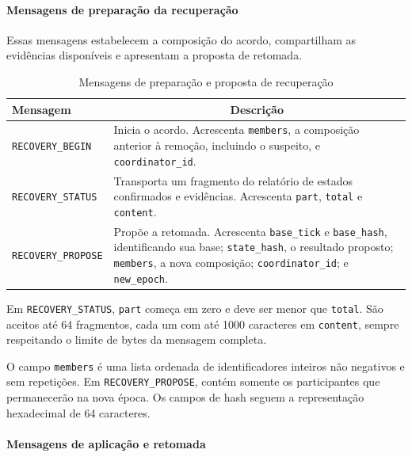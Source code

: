 \documentclass[11pt,a4paper]{article}
\begin{document}
\paragraph{Mensagens de preparação da recuperação}

Essas mensagens estabelecem a composição do acordo, compartilham as evidências disponíveis e apresentam a proposta de retomada.

\begin{table}[H]
    \centering
    \caption{Mensagens de preparação e proposta de recuperação}
    \label{tab:preparacao_recuperacao_p2p}
    \begin{tabular}{|p{4.3cm}|p{9.2cm}|}
        \hline
        \textbf{Mensagem} &
        \multicolumn{1}{c|}{\textbf{Descrição}} \\ \hline

        \texttt{RECOVERY\_BEGIN} &
        Inicia o acordo. Acrescenta \texttt{members}, a composição anterior à remoção, incluindo o suspeito, e \texttt{coordinator\_id}. \\ \hline

        \texttt{RECOVERY\_STATUS} &
        Transporta um fragmento do relatório de estados confirmados e evidências. Acrescenta \texttt{part}, \texttt{total} e \texttt{content}. \\ \hline

        \texttt{RECOVERY\_PROPOSE} &
        Propõe a retomada. Acrescenta \texttt{base\_tick} e \texttt{base\_hash}, identificando sua base; \texttt{state\_hash}, o resultado proposto; \texttt{members}, a nova composição; \texttt{coordinator\_id}; e \texttt{new\_epoch}. \\ \hline
    \end{tabular}
\end{table}

Em \texttt{RECOVERY\_STATUS}, \texttt{part} começa em zero e deve ser menor que \texttt{total}. São aceitos até 64 fragmentos, cada um com até 1000 caracteres em \texttt{content}, sempre respeitando o limite de bytes da mensagem completa.

O campo \texttt{members} é uma lista ordenada de identificadores inteiros não negativos e sem repetições. Em \texttt{RECOVERY\_PROPOSE}, contém somente os participantes que permanecerão na nova época. Os campos de hash seguem a representação hexadecimal de 64 caracteres.

\paragraph{Mensagens de aplicação e retomada}
\end{document}
